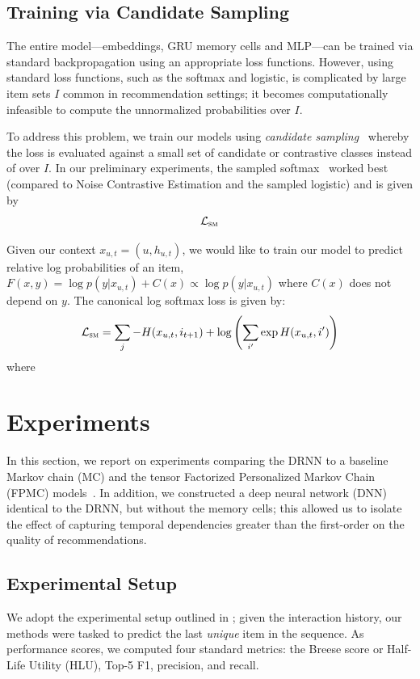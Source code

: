 \documentclass{sig-alternate-05-2015}
\begin{document}
\subsection{Training via Candidate Sampling}
The entire model---embeddings, GRU memory cells and MLP---can be trained via standard backpropagation using an appropriate loss functions. However, using standard loss functions, such as the softmax and logistic, is complicated by large item sets $I$ common in recommendation settings; it becomes computationally infeasible to compute the unnormalized probabilities over $I$. 

To address this problem, we train our models using \emph{candidate sampling}~\cite{TFCandidateSampling} whereby the loss is evaluated against a small set of candidate or contrastive classes instead of over $I$. In our preliminary experiments, the sampled softmax~\cite{Jean2015} worked best (compared to Noise Contrastive Estimation and the sampled logistic) and is given by
\begin{align}
	\mathcal{L}_{\textsc{sm}}
\end{align}

Given our context $x_{u,t} = (u, h_{u,t})$, we would like to train our model to predict relative log probabilities of an item, $F(x,y) = \log p(y|x_{u,t}) + C(x) \propto \log p(y|x_{u,t})$ where $C(x)$ does not depend on $y$. The canonical log softmax loss is given by:
\begin{align}
	\mathcal{L}_{\textsc{sm}} = \sum_j -H(x_{u,t}, i_{t+1}) + \log \left( \sum_{i'} \exp H(x_{u,t}, i') \right)
\end{align}
where 


\section{Experiments}
In this section, we report on experiments comparing the DRNN to a baseline Markov chain (MC) and the tensor Factorized Personalized Markov Chain (FPMC) models~\cite{Rendle2010}. In addition, we constructed a deep neural network (DNN) identical to the DRNN, but without the memory cells; this allowed us to isolate the effect of capturing temporal dependencies greater than the first-order on the quality of recommendations.

\subsection{Experimental Setup}
We adopt the experimental setup outlined in \cite{Rendle2010}; given the interaction history, our methods were tasked to predict the last \emph{unique} item in the sequence. As performance scores, we computed four standard metrics: the Breese score or Half-Life Utility (HLU), Top-5 F1, precision, and recall. 
\end{document}
